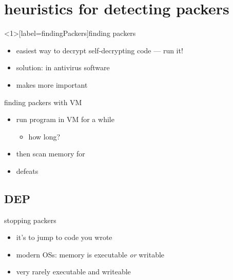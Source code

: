\section{heuristics for detecting packers}

\begin{frame}<1>[label=findingPackers]{finding packers}
    \begin{itemize}
    \item easiest way to decrypt self-decrypting code --- run it!
    \item solution:  in antivirus software
    \vspace{.5cm}
    \item makes  more important
    \end{itemize}
\end{frame}

\begin{frame}{finding packers with VM}
    \begin{itemize}
    \item run program in VM for a while
        \begin{itemize}
        \item how long?
        \end{itemize}
    \item then scan memory for 
    \item defeats 
    \end{itemize}
\end{frame}

\subsection{DEP}

\begin{frame}{stopping packers}
    \begin{itemize}
    \item it's  to jump to code you wrote
    \item modern OSs: memory is executable \textit{or} writable 
    \item very rarely executable and writeable
    \end{itemize}
\end{frame}

